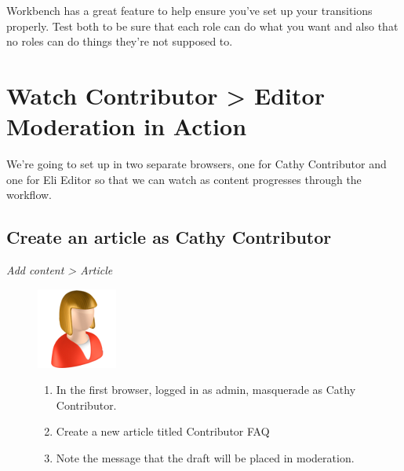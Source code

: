 \documentclass[letterpaper,10pt,english]{sphinxmanual}
\begin{document}
Workbench has a great feature to help ensure you've set up your transitions properly. Test both to be sure that each role can do what you want and also that no roles can do things they're not supposed to.


\chapter{Watch Contributor \textgreater{} Editor Moderation in Action}
\label{moderation:watch-contributor-editor-moderation-in-action}
We're going to set up in two separate browsers, one for Cathy Contributor and one for Eli Editor so that we can watch as content progresses through the workflow.


\section{Create an article as Cathy Contributor}
\label{moderation:faq}\label{moderation:create-an-article-as-cathy-contributor}
\emph{Add content \textgreater{} Article}
\begin{figure}[htbp]
\centering

\includegraphics{sites/default/files/recipes/user_icons/contributor.png}
{\small \begin{enumerate}
\item {} 
In the first browser, logged in as admin, masquerade as Cathy Contributor.

\item {} 
Create a new article titled Contributor FAQ

\item {} 
Note the message that the draft will be placed in moderation.

\end{enumerate}
}\end{figure}
\end{document}
